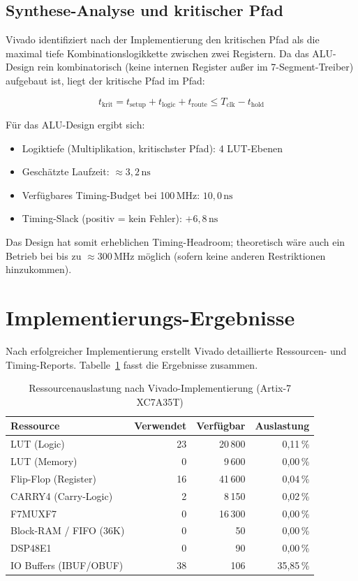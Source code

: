 ﻿\documentclass[12pt,a4paper]{report}
\begin{document}
\subsection{Synthese-Analyse und kritischer Pfad}
\label{subsec:synthese_analyse}

Vivado identifiziert nach der Implementierung den kritischen Pfad als die maximal tiefe Kombinationslogikkette zwischen zwei Registern. Da das ALU-Design rein kombinatorisch (keine internen Register außer im 7-Segment-Treiber) aufgebaut ist, liegt der kritische Pfad im Pfad:

\[
  t_{\text{krit}} = t_{\text{setup}} + t_{\text{logic}} + t_{\text{route}} \leq T_{\text{clk}} - t_{\text{hold}}
\]

Für das ALU-Design ergibt sich:
\begin{itemize}
  \item Logiktiefe (Multiplikation, kritischster Pfad): 4 LUT-Ebenen
  \item Geschätzte Laufzeit: $\approx 3{,}2\,\text{ns}$
  \item Verfügbares Timing-Budget bei 100\,MHz: $10{,}0\,\text{ns}$
  \item Timing-Slack (positiv = kein Fehler): $+6{,}8\,\text{ns}$
\end{itemize}

Das Design hat somit erheblichen Timing-Headroom; theoretisch wäre auch ein Betrieb bei bis zu $\approx 300\,\text{MHz}$ möglich (sofern keine anderen Restriktionen hinzukommen).

\section{Implementierungs-Ergebnisse}
\label{sec:impl_ergebnisse}

Nach erfolgreicher Implementierung erstellt Vivado detaillierte Ressourcen- und Timing-Reports. Tabelle~\ref{tab:ressourcen} fasst die Ergebnisse zusammen.

\begin{table}[H]
\centering
\begin{tabular}{|l|r|r|r|}
\hline
\textbf{Ressource} & \textbf{Verwendet} & \textbf{Verfügbar} & \textbf{Auslastung} \\
\hline
LUT (Logic)               & 23  & 20\,800 & 0{,}11\,\% \\
LUT (Memory)              & 0   & 9\,600  & 0{,}00\,\% \\
Flip-Flop (Register)      & 16  & 41\,600 & 0{,}04\,\% \\
CARRY4 (Carry-Logic)      & 2   & 8\,150  & 0{,}02\,\% \\
F7MUXF7                   & 0   & 16\,300 & 0{,}00\,\% \\
Block-RAM / FIFO (36K)    & 0   & 50      & 0{,}00\,\% \\
DSP48E1                   & 0   & 90      & 0{,}00\,\% \\
IO Buffers (IBUF/OBUF)    & 38  & 106     & 35{,}85\,\% \\
\hline
\end{tabular}
\caption{Ressourcenauslastung nach Vivado-Implementierung (Artix-7 XC7A35T)}
\label{tab:ressourcen}
\end{table}
\end{document}
